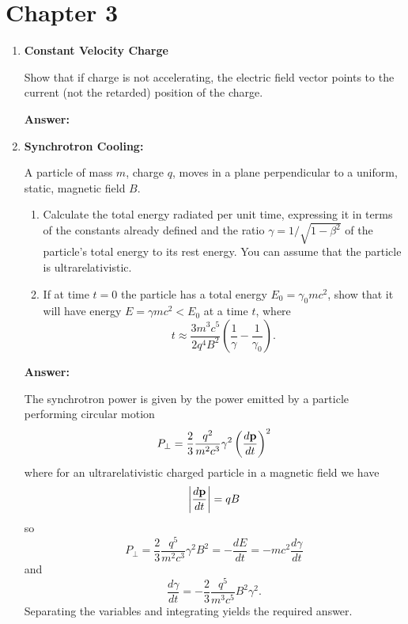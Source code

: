 \documentclass{article}
\begin{document}
\fi
\section{Chapter 3}
\begin{enumerate}
\item{\bf Constant Velocity Charge}

Show that if charge is not accelerating, the electric field vector
points to the current (not the retarded) position of the charge.

{\bf Answer:}

\begin{center}
\end{center}

\setcounter{enumi}{3}

\item{\bf Synchrotron Cooling:}

A particle of mass $m$, charge $q$, moves in a plane perpendicular to
a uniform, static, magnetic field $B$.
\begin{enumerate}
\item
Calculate the total energy radiated per unit time, expressing it in
terms of the constants already defined and the ratio
$\gamma=1/\sqrt{1-\beta^2}$ of the particle's total energy to its rest 
energy.  You can assume that the particle is ultrarelativistic.
\item
If at time $t=0$ the particle has a total energy $E_0=\gamma_0 m c^2$,
show that it will have energy $E=\gamma m c^2 < E_0$ at a time $t$,
where
\[
t \approx \frac{3 m^3 c^5}{2 q^4 B^2} \left ( \frac{1}{\gamma} -
\frac{1}{\gamma_0} \right ).
\]
\end{enumerate}

{\bf Answer:}

The synchrotron power is given by the power emitted by a particle
performing circular motion
$$
P_\perp = \frac{2}{3} \frac{q^2}{m^2 c^3} \gamma^2 \left ( \frac{d
    {\bf p}}{dt} \right )^2
$$
where for an ultrarelativistic charged particle in a magnetic field we
have
$$
\left | \frac{d {\bf p}}{dt} \right | = q B
$$
so
$$
P_\perp =  \frac{2}{3} \frac{q^5}{m^2 c^3} \gamma^2 B^2 = -\frac{d
  E}{dt} = -m c^2 \frac{d \gamma}{dt}
$$
and
$$
\frac{d \gamma}{dt} = -\frac{2}{3} \frac{q^5}{m^3 c^5} B^2 \gamma^2.
$$
Separating the variables and integrating yields the required answer.


\end{enumerate}
\end{document}
